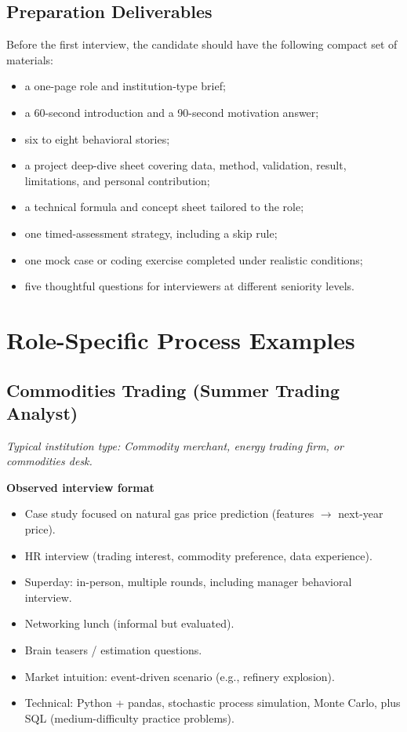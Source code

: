\documentclass[11pt,letterpaper,openany]{book}
\newcommand{\RoleProfile}[2]{%
  \subsection{#1}%
  \noindent\textit{Typical institution type: #2.}\par
}
\begin{document}
\subsection{Preparation Deliverables}
Before the first interview, the candidate should have the following compact set of materials:
\begin{itemize}
  \item a one-page role and institution-type brief;
  \item a 60-second introduction and a 90-second motivation answer;
  \item six to eight behavioral stories;
  \item a project deep-dive sheet covering data, method, validation, result, limitations, and personal contribution;
  \item a technical formula and concept sheet tailored to the role;
  \item one timed-assessment strategy, including a skip rule;
  \item one mock case or coding exercise completed under realistic conditions;
  \item five thoughtful questions for interviewers at different seniority levels.
\end{itemize}
\section{Role-Specific Process Examples}

\RoleProfile{Commodities Trading (Summer Trading Analyst)}{Commodity merchant, energy trading firm, or commodities desk}
\textbf{Observed interview format}
\begin{itemize}
  \item Case study focused on natural gas price prediction (features $\to$ next-year price).
  \item HR interview (trading interest, commodity preference, data experience).
  \item Superday: in-person, multiple rounds, including manager behavioral interview.
  \item Networking lunch (informal but evaluated).
  \item Brain teasers / estimation questions.
  \item Market intuition: event-driven scenario (e.g., refinery explosion).
  \item Technical: Python + pandas, stochastic process simulation, Monte Carlo, plus SQL (medium-difficulty practice problems).
\end{itemize}
\end{document}
